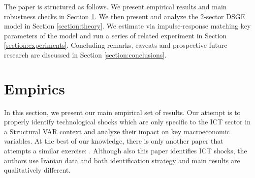 \documentclass[12pt]{article}
\begin{document}
\begin{comment}
Our paper is mainly related to three strands of literature. First of all, we link to the literature that investigates the recent slowdown in TFP growth. Our project is motivated by papers such as \cite{oliner2007explaining}, \cite{jorgenson2008retrospective}, \cite{byrne2016does}, \cite{cette2016pre}, and \cite{fernald2017disappointing} who document that the slowdown in TFP growth occurred before the recession implying that the financial crisis per se cannot be its cause.\footnote{In particular, in line with our results, also \cite{fernald2017disappointing} conclude that the pause in the information technology revolution is the main candidate explanation.} Secondly, our project is related to the literature that investigate the effects of investment-specific technology shocks in a multi-sector economy. In particular, throughout the paper our main references will be \cite{greenwood1997long}, \cite{oulton2007investment}, and \cite{fisher2006dynamic}. However, both the empirical exercise and the theoretical model are strictly related to \cite{greenwood2000role}, \cite{basu2010sector}, and \cite{justiniano2011investment}. Finally, this paper is also related to papers that argue that information and communication technology is the current general-purpose technology. Main references will be bresnan, and \cite{basu2007information}.
\end{comment}

The paper is structured as follows. We present empirical results and main robustness checks in Section \ref{section:empirics}. We then present and analyze the 2-sector DSGE model in Section \ref{section:theory}. We estimate via impulse-response matching key parameters of the model and run a series of related experiment in Section \ref{section:experiments}. Concluding remarks, caveats and prospective future research are discussed in Section \ref{section:conclusions}.



\section{Empirics}\label{section:empirics}

In this section, we present our main empirical set of results. Our attempt is to properly identify technological shocks which are only specific to the ICT sector in a Structural VAR context and analyze their impact on key macroeconomic variables. At the best of our knowledge, there is only another paper that attempts a similar exercise: \cite{jafari2012impact}. Although also this paper identifies ICT shocks, the authors use Iranian data and both identification strategy and main results are qualitatively different.
\end{document}
